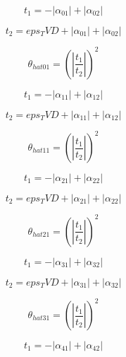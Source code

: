 \documentclass{article}
\begin{document}
\begin{dmath}t_{1} = - \left|{\alpha_{01}}\right| + \left|{\alpha_{02}}\right|\end{dmath}

\begin{dmath}t_{2} = eps_TVD + \left|{\alpha_{01}}\right| + \left|{\alpha_{02}}\right|\end{dmath}

\begin{dmath}\theta_{hat 01} = \left(\left|{\frac{t_{1}}{t_{2}}}\right| \right)^{2}\end{dmath}

\begin{dmath}t_{1} = - \left|{\alpha_{11}}\right| + \left|{\alpha_{12}}\right|\end{dmath}

\begin{dmath}t_{2} = eps_TVD + \left|{\alpha_{11}}\right| + \left|{\alpha_{12}}\right|\end{dmath}

\begin{dmath}\theta_{hat 11} = \left(\left|{\frac{t_{1}}{t_{2}}}\right| \right)^{2}\end{dmath}

\begin{dmath}t_{1} = - \left|{\alpha_{21}}\right| + \left|{\alpha_{22}}\right|\end{dmath}

\begin{dmath}t_{2} = eps_TVD + \left|{\alpha_{21}}\right| + \left|{\alpha_{22}}\right|\end{dmath}

\begin{dmath}\theta_{hat 21} = \left(\left|{\frac{t_{1}}{t_{2}}}\right| \right)^{2}\end{dmath}

\begin{dmath}t_{1} = - \left|{\alpha_{31}}\right| + \left|{\alpha_{32}}\right|\end{dmath}

\begin{dmath}t_{2} = eps_TVD + \left|{\alpha_{31}}\right| + \left|{\alpha_{32}}\right|\end{dmath}

\begin{dmath}\theta_{hat 31} = \left(\left|{\frac{t_{1}}{t_{2}}}\right| \right)^{2}\end{dmath}

\begin{dmath}t_{1} = - \left|{\alpha_{41}}\right| + \left|{\alpha_{42}}\right|\end{dmath}
\end{document}

